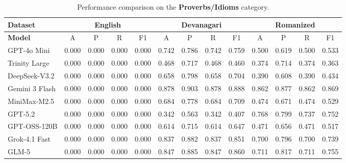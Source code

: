 \documentclass[10pt, a4paper]{article}
\begin{document}
\begin{table}[t]
\centering
\footnotesize
\setlength{\tabcolsep}{4pt}
\renewcommand{\arraystretch}{1.1}

\begin{tabular}{|>{\raggedright\arraybackslash}p{3cm}|cccc|cccc|cccc|}
\hline
\textbf{Dataset}
& \multicolumn{4}{c|}{\textbf{English}}
& \multicolumn{4}{c|}{\textbf{Devanagari}}
& \multicolumn{4}{c|}{\textbf{Romanized}} \\
\hline
\textbf{Model}
& A & P & R & F1 & A & P & R & F1 & A & P & R & F1 \\
\hline
GPT-4o Mini & 0.000 & 0.000 & 0.000 & 0.000 & 0.742& 0.786& 0.742& 0.759& 0.500& 0.619& 0.500& 0.533\\
\hline
Trinity Large & 0.000 & 0.000 & 0.000 & 0.000 & 0.468& 0.717& 0.468& 0.460& 0.374& 0.714& 0.374& 0.363\\
\hline
DeepSeek-V3.2 & 0.000 & 0.000 & 0.000 & 0.000 & 0.658& 0.798& 0.658& 0.704& 0.390& 0.608& 0.390& 0.434\\
\hline
Gemini 3 Flash & 0.000 & 0.000 & 0.000 & 0.000 & 0.878& 0.903& 0.878& 0.888& 0.862& 0.877& 0.862& 0.869\\
\hline
MiniMax-M2.5 & 0.000 & 0.000 & 0.000 & 0.000 & 0.684& 0.778& 0.684& 0.709& 0.474& 0.671& 0.474& 0.529\\
\hline
GPT-5.2 & 0.000 & 0.000 & 0.000 & 0.000 & 0.342& 0.563& 0.342& 0.407& 0.768& 0.799& 0.737& 0.752\\
\hline
GPT-OSS-120B & 0.000 & 0.000 & 0.000 & 0.000 & 0.614& 0.715& 0.614& 0.647& 0.471& 0.656& 0.471& 0.517\\
\hline
Grok-4.1 Fast & 0.000 & 0.000 & 0.000 & 0.000 & 0.837& 0.882& 0.837& 0.851& 0.700& 0.796& 0.700& 0.739\\
\hline
GLM-5 & 0.000 & 0.000 & 0.000 & 0.000 & 0.847& 0.885& 0.847& 0.860& 0.711& 0.817& 0.711& 0.755\\
\hline
\end{tabular}
\caption{Performance comparison on the \textbf{Proverbs/Idioms} category.}
\label{tab:ukhan_results}
\end{table}
\end{document}
